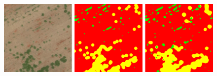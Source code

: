 \documentclass[
]{dtuposter}
\begin{document}
\begin{dtupostercontent}
\begin{figure}
	\begin{center}
			\includegraphics[width=\linewidth,origin=c]{reconst}
	\end{center}
\end{figure}


\end{dtupostercontent}
\end{document}
